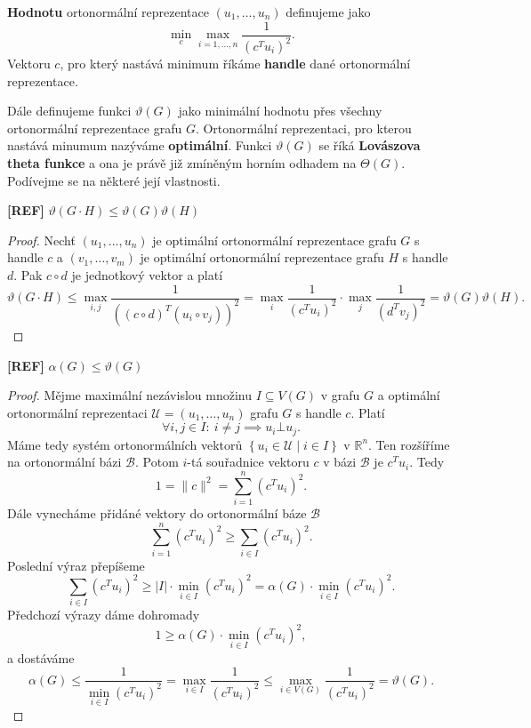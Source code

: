 \noindent \textbf{Hodnotu} ortonormální reprezentace $\left(u_1, \dots, u_n \right)$ definujeme jako
$$
    \min_c \max_{i = 1, \dots, n} \frac{1}{\left( c^T u_i \right)^2}.
$$
Vektoru $c$, pro který nastává minimum říkáme \textbf{handle} dané ortonormální reprezentace.

Dále definujeme funkci $\vartheta(G)$ jako minimální hodnotu přes všechny ortonormální reprezentace grafu $G$. Ortonormální reprezentaci, pro kterou nastává minumum nazýváme \textbf{optimální}. Funkci $\vartheta(G)$ se říká \textbf{Lovászova theta funkce} a ona je právě již zmíněným horním odhadem na $\Theta(G)$. Podívejme se na některé její vlastnosti.

\begin{lm}\textbf{[REF]}
    $\vartheta(G \cdot H) \leq \vartheta(G) \vartheta(H)$
\end{lm}

\begin{proof}
    Nechť $\left( u_1, \dots, u_n \right)$ je optimální ortonormální reprezentace grafu $G$ s handle $c$ a $\left( v_1, \dots, v_m \right)$ je optimální ortonormální reprezentace grafu $H$ s handle $d$. Pak $c \circ d$ je jednotkový vektor a platí
    $$
        \vartheta(G \cdot H) \leq \max_{i,j} \frac{1}{\left( \left( c \circ d \right)^T \left( u_i \circ v_j \right) \right)^2} = \max_i \frac{1}{\left( c^T u_i \right)^2} \cdot \max_j \frac{1}{\left( d^T v_j \right)^2} = \vartheta(G)\vartheta(H).
    $$
\end{proof}

\begin{lm}\textbf{[REF]}
    $\alpha(G) \leq \vartheta(G)$
\end{lm}

\begin{proof}
    Mějme maximální nezávislou množinu $I \subseteq V(G)$ v grafu $G$ a optimální ortonormální reprezentaci $\mathcal{U} = \left( u_1, \dots, u_n \right)$ grafu $G$ s handle $c$. Platí
    $$
        \forall i,j \in I:\ i \neq j \implies u_i \bot u_j.
    $$
    Máme tedy systém ortonormálních vektorů $\left\{ u_i \in \mathcal{U} \mid i \in I \right\}$ v $\mathbb{R}^n$. Ten rozšíříme na ortonormální bázi $\mathcal{B}$. Potom $i$-tá souřadnice vektoru $c$ v bázi $\mathcal{B}$ je $c^T u_i$. Tedy
    $$
        1 = \| c \|^2 = \sum_{i=1}^n \left( c^T u_i \right)^2.
    $$
    Dále vynecháme přidáné vektory do ortonormální báze $\mathcal{B}$
    $$
        \sum_{i=1}^n \left( c^T u_i \right)^2 \geq \sum_{i \in I} \left( c^T u_i \right)^2.
    $$
    Poslední výraz přepíšeme
    $$
        \sum_{i \in I} \left( c^T u_i \right)^2 \geq |I| \cdot \min_{i \in I}\left( c^T u_i \right)^2 = \alpha(G) \cdot \min_{i \in I}\left( c^T u_i \right)^2.
    $$
    Předchozí výrazy dáme dohromady
    $$
        1 \geq \alpha(G) \cdot \min_{i \in I}\left( c^T u_i \right)^2,
    $$
    a dostáváme
    $$
        \alpha(G) \leq \frac{1}{\min_{i \in I}\left( c^T u_i \right)^2} = \max_{i \in I} \frac{1}{\left( c^T u_i \right)^2} \leq \max_{i \in V(G)} \frac{1}{\left( c^T u_i \right)^2} = \vartheta(G).
    $$
\end{proof}

